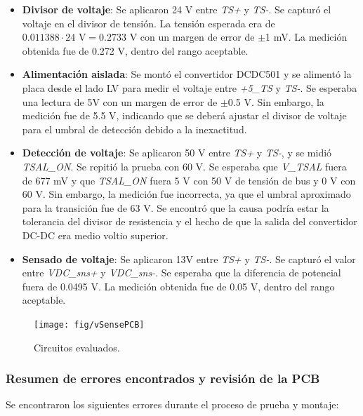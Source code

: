 \begin{itemize}
	\item \textbf{Divisor de voltaje}: Se aplicaron 24 V entre \textit{TS+} y \textit{TS-}. Se capturó el voltaje en el divisor de tensión. La tensión esperada era de $0.011388 \cdot 24\text{ V} = 0.2733 \text{ V}$ con un margen de error de $\pm$1 mV. La medición obtenida fue de 0.272 V, dentro del rango aceptable.
	
	\item \textbf{Alimentación aislada}: Se montó el convertidor DCDC501 y se alimentó la placa desde el lado LV para medir el voltaje entre \textit{+5\_TS} y \textit{TS-}. Se esperaba una lectura de 5V con un margen de error de $\pm$0.5 V. Sin embargo, la medición fue de 5.5 V, indicando que se deberá ajustar el divisor de voltaje para el umbral de detección debido a la inexactitud.
	
	\item \textbf{Detección de voltaje}: Se aplicaron 50 V entre \textit{TS+} y \textit{TS-}, y se midió \textit{TSAL\_ON}. Se repitió la prueba con 60 V. Se esperaba que \textit{V\_TSAL} fuera de 677 mV y que \textit{TSAL\_ON} fuera 5 V con 50 V de tensión de bus y 0 V con 60 V. Sin embargo, la medición fue incorrecta, ya que el umbral aproximado para la transición fue de 63 V. Se encontró que la causa podría estar la tolerancia del divisor de resistencia y el hecho de que la salida del convertidor DC-DC era medio voltio superior.

	\item \textbf{Sensado de voltaje}: Se aplicaron 13V entre \textit{TS+} y \textit{TS-}. Se capturó el valor entre \textit{VDC\_sns+} y \textit{VDC\_sns-}. Se esperaba que la diferencia de potencial fuera de 0.0495 V. La medición obtenida fue de 0.05 V, dentro del rango aceptable.
\end{itemize}

\begin{figure}[H]
	\centering
	\texttt{[image: fig/vSensePCB]}
	\caption{Circuitos evaluados.}
\end{figure}


\subsubsection{Resumen de errores encontrados y revisión de la PCB}

Se encontraron los siguientes errores durante el proceso de prueba y montaje:

